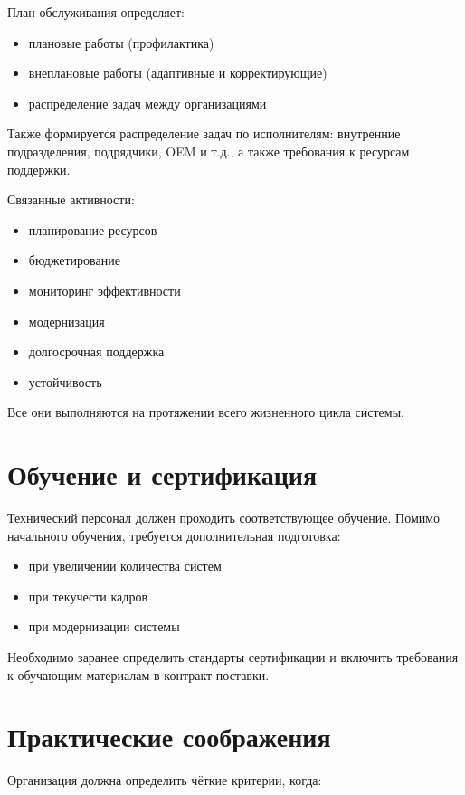 \documentclass[14pt,a4paper]{extarticle}
\begin{document}
План обслуживания определяет:

\begin{itemize}
\item плановые работы (профилактика)
\item внеплановые работы (адаптивные и корректирующие)
\item распределение задач между организациями
\end{itemize}

Также формируется распределение задач по исполнителям: внутренние подразделения, подрядчики, OEM и т.д., а также требования к ресурсам поддержки.

Связанные активности:

\begin{itemize}
\item планирование ресурсов
\item бюджетирование
\item мониторинг эффективности
\item модернизация
\item долгосрочная поддержка
\item устойчивость
\end{itemize}

Все они выполняются на протяжении всего жизненного цикла системы.

\section{Обучение и сертификация}

Технический персонал должен проходить соответствующее обучение. Помимо начального обучения, требуется дополнительная подготовка:

\begin{itemize}
\item при увеличении количества систем
\item при текучести кадров
\item при модернизации системы
\end{itemize}

Необходимо заранее определить стандарты сертификации и включить требования к обучающим материалам в контракт поставки.

\section{Практические соображения}

Организация должна определить чёткие критерии, когда:
\end{document}
